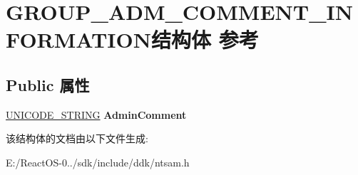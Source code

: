 \hypertarget{struct_g_r_o_u_p___a_d_m___c_o_m_m_e_n_t___i_n_f_o_r_m_a_t_i_o_n}{}\section{G\+R\+O\+U\+P\+\_\+\+A\+D\+M\+\_\+\+C\+O\+M\+M\+E\+N\+T\+\_\+\+I\+N\+F\+O\+R\+M\+A\+T\+I\+O\+N结构体 参考}
\label{struct_g_r_o_u_p___a_d_m___c_o_m_m_e_n_t___i_n_f_o_r_m_a_t_i_o_n}
\subsection*{Public 属性}
\begin{DoxyCompactItemize}
\item 
\mbox{\label{struct_g_r_o_u_p___a_d_m___c_o_m_m_e_n_t___i_n_f_o_r_m_a_t_i_o_n_a622aa4992a276455bf567d7235e165b8}} 
\hyperlink{struct___u_n_i_c_o_d_e___s_t_r_i_n_g}{U\+N\+I\+C\+O\+D\+E\+\_\+\+S\+T\+R\+I\+NG} {\bfseries Admin\+Comment}
\end{DoxyCompactItemize}


该结构体的文档由以下文件生成\+:\begin{DoxyCompactItemize}
\item 
E\+:/\+React\+O\+S-\/0../sdk/include/ddk/ntsam.\+h\end{DoxyCompactItemize}
